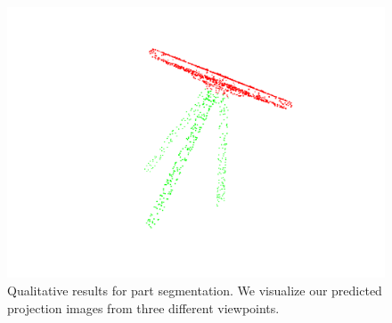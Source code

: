 \begin{figure}[htbp]
\begin{minipage}{0.25\textwidth}
        \centering
        \includegraphics[width=\textwidth]{fig/supplement/part_segmentation/table/table02.pdf}
    \end{minipage}
    \hfill
    \caption{Qualitative results for part segmentation. We visualize our predicted projection images from three different viewpoints.}
    \label{fig:part_segmentation}
\end{figure}

